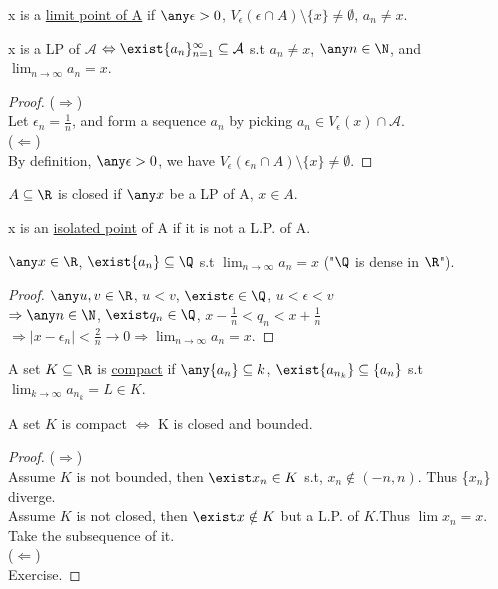 \begin{definition}
    x is a \uline{limit point of A} if $\any \epsilon > 0$, $V_\epsilon(\epsilon \cap A) \setminus \{x\} \neq \emptyset$, $a_n \neq x$.
\end{definition}
\begin{theorem}
    x is a LP of $\mathcal{A}$ $\Leftrightarrow \exist \{ a_n \}_{n=1}^\infty \subseteq \mathcal{A}$ s.t $a_n \neq x$, $\any n \in \N$, and $\lim_{n\to\infty} a_n = x$.
\end{theorem}
\begin{proof}
    ($\Rightarrow$) \\
    Let $\epsilon_n = \frac{1}{n}$, and form a sequence {$a_n$} by picking $a_n \in V_{\epsilon}(x)\cap\mathcal{A}$. \\
    ($\Leftarrow$) \\
    By definition, $\any \epsilon > 0$, we have $V_\epsilon(\epsilon_n \cap A) \setminus \{x\} \neq \emptyset$.
\end{proof}
\begin{definition}
    $A \subseteq \R$ is closed if $\any x$ be a LP of A, $x \in A$.
\end{definition}
\begin{definition}
    x is an \uline{isolated point} of A if it is not a L.P. of A.
\end{definition}
\begin{theorem}
    $\any x \in \R$, $\exist \{a_n\} \subseteq \Q$ s.t $\lim_{n\to\infty} a_n = x$ ("$\Q$ is dense in $\R$").
\end{theorem}
\begin{proof}
    $\any u,v \in \R$, $u<v$, $\exist\epsilon \in \Q$, $u<\epsilon<v$ \\
    $\Rightarrow \any n\in \N$, $\exist q_n \in \Q$, $x-\frac{1}{n} < q_n <x+ \frac{1}{n}$\\
    $\Rightarrow |x-\epsilon_n| < \frac{2}{n} \rightarrow 0 \Rightarrow \lim_{n\to\infty} a_n =x$.
\end{proof}
\begin{definition}
    A set $K \subseteq \R$ is \uline{compact} if $\any \{a_n\} \subseteq k$, $\exist \{ a_{n_k} \} \subseteq\{a_n\}$ s.t $\lim_{k\to\infty} a_{n_k} = L \in K$.
\end{definition}
\begin{theorem}
    A set $K$ is compact $\Leftrightarrow$ K is closed and bounded.
\end{theorem}
\begin{proof}
    ($\Rightarrow$)\\
    Assume $K$ is not bounded, then $\exist x_n \in K$ s.t, $x_n \notin (-n,n)$. Thus \{$x_n$\} diverge. \\
    Assume $K$ is not closed, then $\exist x \notin K$ but a L.P. of $K$.Thus $\lim x_n = x$. Take the subsequence of it. \\
    ($\Leftarrow$) \\
    Exercise.
\end{proof}

